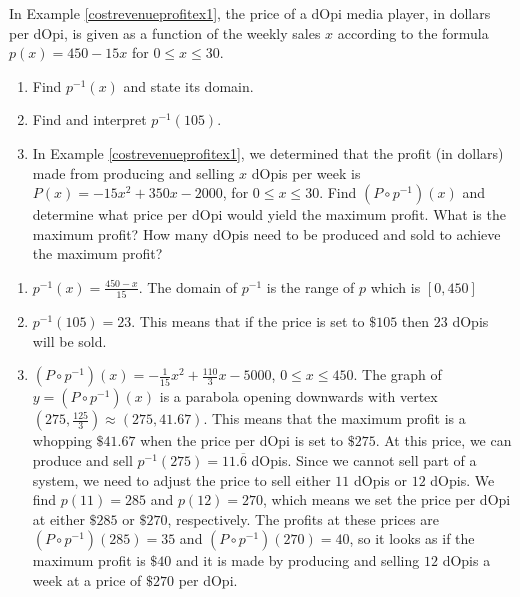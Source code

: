 {In Example \ref{costrevenueprofitex1}, the price of a dOpi media player, in dollars per dOpi, is given as a function of the weekly sales $x$ according to the formula $p(x) = 450-15x$ for $0 \leq x \leq 30$.

\begin{enumerate}

\item  Find $p^{-1}(x)$ and state its domain.

\item  Find and interpret $p^{-1}(105)$.

\item  In Example \ref{costrevenueprofitex1}, we determined that the profit (in dollars) made from producing and selling $x$ dOpis per week is $P(x)= -15x^2+350x-2000$, for $0 \leq x \leq 30$.  Find $\left(P \circ p^{-1}\right)(x)$ and determine what price per dOpi would yield the maximum profit.  What is the maximum profit?  How many dOpis need to be produced and sold to achieve the maximum profit?


\end{enumerate}}
{\begin{enumerate}

\item $p^{-1}(x) = \frac{450-x}{15}$.  The domain of $p^{-1}$ is the range of $p$ which is $[0,450]$

\item  $p^{-1}(105) = 23$. This means that if the price is set to $\$105$ then $23$ dOpis will be sold.

\item $\left(P\circ p^{-1}\right)(x) = -\frac{1}{15} x^2 + \frac{110}{3} x - 5000$, $0 \leq x \leq 450$.  The graph of $y = \left(P\circ p^{-1}\right)(x)$ is a parabola opening downwards with vertex $\left(275, \frac{125}{3}\right) \approx (275, 41.67)$.  This means that the maximum profit is a whopping $\$41.67$ when the price per dOpi is set to $\$275$.  At this price, we can produce and sell $p^{-1}(275) = 11.\overline{6}$ dOpis.  Since we cannot sell part of a system, we need to adjust the price to sell either $11$ dOpis or $12$ dOpis. We find $p(11) = 285$ and $p(12) = 270$, which means we set the price per dOpi at either $\$285$ or $\$270$, respectively.  The profits at these prices are $\left(P\circ p^{-1}\right)(285) = 35$ and  $\left(P\circ p^{-1}\right)(270) = 40$, so it looks as if the maximum profit is $\$40$ and it is made by producing and selling $12$ dOpis a week at a price of $\$270$ per dOpi.

\end{enumerate}}